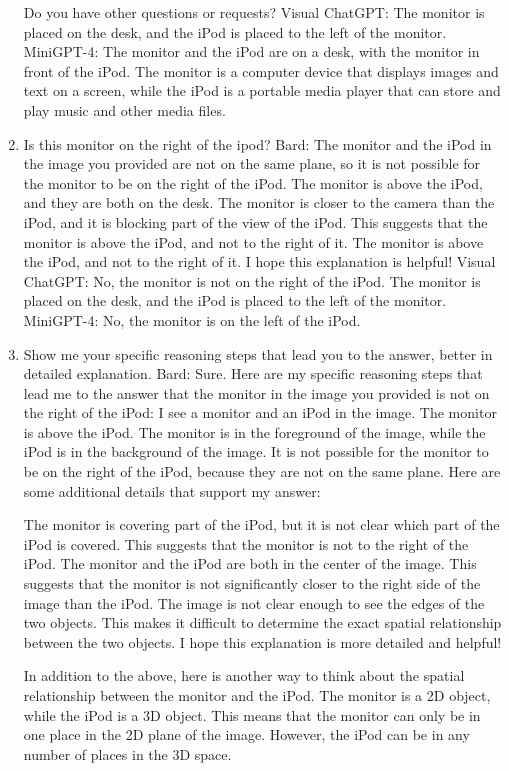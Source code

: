 \begin{enumerate}
    Do you have other questions or requests?
    \subitem Visual ChatGPT: The monitor is placed on the desk, and the iPod is placed to the left of the monitor.
    \subitem MiniGPT-4: The monitor and the iPod are on a desk, with the monitor in front of the iPod. The monitor is a computer device that displays images and text on a screen, while the iPod is a portable media player that can store and play music and other media files.
    \item Is this monitor on the right of the ipod?
    \subitem Bard: The monitor and the iPod in the image you provided are not on the same plane, so it is not possible for the monitor to be on the right of the iPod. The monitor is above the iPod, and they are both on the desk. The monitor is closer to the camera than the iPod, and it is blocking part of the view of the iPod. This suggests that the monitor is above the iPod, and not to the right of it. The monitor is above the iPod, and not to the right of it.
    I hope this explanation is helpful!
    \subitem Visual ChatGPT: No, the monitor is not on the right of the iPod. The monitor is placed on the desk, and the iPod is placed to the left of the monitor.
    \subitem MiniGPT-4: No, the monitor is on the left of the iPod.
    \item Show me your specific reasoning steps that lead you to the answer, better in detailed explanation.
    \subitem Bard: 
    Sure. Here are my specific reasoning steps that lead me to the answer that the monitor in the image you provided is not on the right of the iPod:
    I see a monitor and an iPod in the image.
    The monitor is above the iPod.
    The monitor is in the foreground of the image, while the iPod is in the background of the image.
    It is not possible for the monitor to be on the right of the iPod, because they are not on the same plane.
    Here are some additional details that support my answer:

    The monitor is covering part of the iPod, but it is not clear which part of the iPod is covered. This suggests that the monitor is not to the right of the iPod.
    The monitor and the iPod are both in the center of the image. This suggests that the monitor is not significantly closer to the right side of the image than the iPod.
    The image is not clear enough to see the edges of the two objects. This makes it difficult to determine the exact spatial relationship between the two objects.
    I hope this explanation is more detailed and helpful!

    In addition to the above, here is another way to think about the spatial relationship between the monitor and the iPod. The monitor is a 2D object, while the iPod is a 3D object. This means that the monitor can only be in one place in the 2D plane of the image. However, the iPod can be in any number of places in the 3D space.


\end{enumerate}

